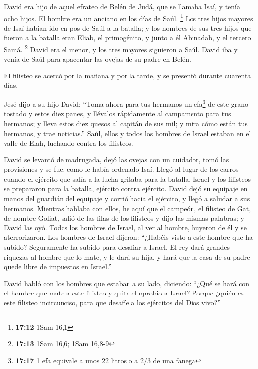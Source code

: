  David era hijo de aquel efrateo de Belén de Judá, que se
llamaba Isaí, y tenía ocho hijos. El hombre era un anciano en los días
de Saúl. \footnote{\textbf{17:12} 1Sam 16,1}  Los tres
hijos mayores de Isaí habían ido en pos de Saúl a la batalla; y los
nombres de sus tres hijos que fueron a la batalla eran Eliab, el
primogénito, y junto a él Abinadab, y el tercero Samá. \footnote{\textbf{17:13}
  1Sam 16,6; 1Sam 16,8-9}  David era el menor, y los tres
mayores siguieron a Saúl.  David iba y venía de Saúl para
apacentar las ovejas de su padre en Belén.

 El filisteo se acercó por la mañana y por la tarde, y se
presentó durante cuarenta días.

 Jesé dijo a su hijo David: ``Toma ahora para tus
hermanos un efa\footnote{\textbf{17:17} 1 efa equivale a unos 22 litros
  o a 2/3 de una fanega} de este grano tostado y estos diez panes, y
llévalos rápidamente al campamento para tus hermanos;  y
lleva estos diez quesos al capitán de sus mil; y mira cómo están tus
hermanos, y trae noticias.''  Saúl, ellos y todos los
hombres de Israel estaban en el valle de Elah, luchando contra los
filisteos.

 David se levantó de madrugada, dejó las ovejas con un
cuidador, tomó las provisiones y se fue, como le había ordenado Isaí.
Llegó al lugar de los carros cuando el ejército que salía a la lucha
gritaba para la batalla.  Israel y los filisteos se
prepararon para la batalla, ejército contra ejército. 
David dejó su equipaje en manos del guardián del equipaje y corrió hacia
el ejército, y llegó a saludar a sus hermanos.  Mientras
hablaba con ellos, he aquí que el campeón, el filisteo de Gat, de nombre
Goliat, salió de las filas de los filisteos y dijo las mismas palabras;
y David las oyó.  Todos los hombres de Israel, al ver al
hombre, huyeron de él y se aterrorizaron.  Los hombres de
Israel dijeron: ``¿Habéis visto a este hombre que ha subido? Seguramente
ha subido para desafiar a Israel. El rey dará grandes riquezas al hombre
que lo mate, y le dará su hija, y hará que la casa de su padre quede
libre de impuestos en Israel.''

 David habló con los hombres que estaban a su lado,
diciendo: ``¿Qué se hará con el hombre que mate a este filisteo y quite
el oprobio a Israel? Porque ¿quién es este filisteo incircunciso, para
que desafíe a los ejércitos del Dios vivo?''

